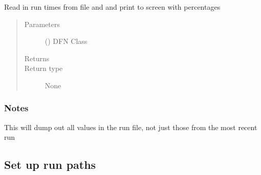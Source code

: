 \documentclass[letterpaper,10pt,english]{sphinxmanual}
\begin{document}
\begin{fulllineitems}
\label{\detokenize{pydfnworks:pydfnworks.general.general_functions.print_run_time}}
Read in run times from file and and print to screen with percentages
\begin{quote}\begin{description}
\item[{Parameters}] \leavevmode
{} () \textendash{} DFN Class

\item[{Returns}] \leavevmode


\item[{Return type}] \leavevmode
None

\end{description}\end{quote}
\subsubsection*{Notes}

This will dump out all values in the run file, not just those from the most recent run

\end{fulllineitems}



\subsection{Set up run paths}
\label{\detokenize{pydfnworks:module-pydfnworks.general.paths}}\label{\detokenize{pydfnworks:set-up-run-paths}}
\end{document}

